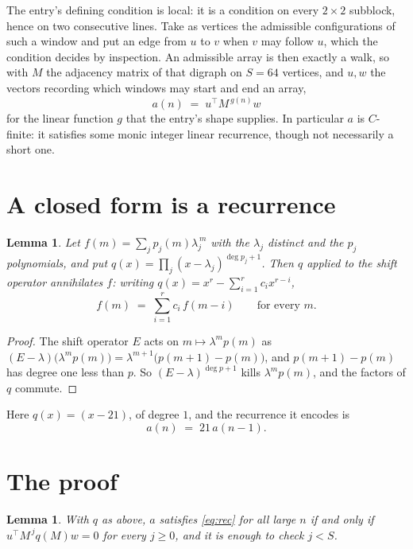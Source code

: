 \documentclass[11pt,a4paper]{article}
\theoremstyle{plain}
\newtheorem{lemma}[theorem]{Lemma}
\theoremstyle{definition}
\begin{document}
The entry's defining condition is local: it is a condition on every $2\times2$ subblock, hence on two consecutive lines. Take as vertices the
admissible configurations of such a window and put an edge from $u$ to $v$ when $v$ may
follow $u$, which the condition decides by inspection. An admissible array is then exactly a
walk, so with $M$ the adjacency matrix of that digraph on $S=64$ vertices, and $u,w$ the
vectors recording which windows may start and end an array,
\[
a(n)\;=\;u^{\!\top}M^{\,g(n)}w
\]
for the linear function $g$ that the entry's shape supplies. In particular $a$ is
$C$-finite: it satisfies some monic integer linear recurrence, though not necessarily a short
one.

\section{A closed form is a recurrence}

\begin{lemma}\label{lem:ann}
Let $f(m)=\sum_{j}p_j(m)\lambda_j^{\,m}$ with the $\lambda_j$ distinct and the $p_j$
polynomials, and put $q(x)=\prod_j(x-\lambda_j)^{\deg p_j+1}$. Then $q$ applied to the shift
operator annihilates $f$: writing $q(x)=x^{r}-\sum_{i=1}^{r}c_ix^{r-i}$,
\[
f(m)\;=\;\sum_{i=1}^{r}c_i\,f(m-i)\qquad\text{for every }m.
\]
\end{lemma}

\begin{proof}
The shift operator $E$ acts on $m\mapsto\lambda^{m}p(m)$ as
$(E-\lambda)\bigl(\lambda^{m}p(m)\bigr)=\lambda^{m+1}\bigl(p(m+1)-p(m)\bigr)$, and
$p(m+1)-p(m)$ has degree one less than $p$. So $(E-\lambda)^{\deg p+1}$ kills
$\lambda^{m}p(m)$, and the factors of $q$ commute.
\end{proof}

Here $q(x)=(x-21)$, of degree $1$, and the recurrence it encodes is
\begin{equation}\label{eq:rec}
a(n)\;=\;21\,a(n-1).
\end{equation}

\section{The proof}

\begin{lemma}\label{lem:crit}
With $q$ as above, $a$ satisfies \eqref{eq:rec} for all large $n$ if and only if
$u^{\!\top}M^{\,j}q(M)w=0$ for every $j\ge0$, and it is enough to check $j<S$.
\end{lemma}
\end{document}
